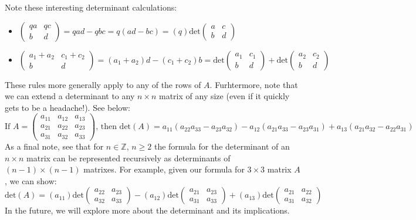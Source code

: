 \documentclass[12pt]{amsart}
\begin{document}
Note these interesting determinant calculations:
\begin{itemize}
	\item $\begin{pmatrix}qa&qc\\b&d\end{pmatrix} = qad-qbc = q(ad-bc) = (q)\mathrm{det}\begin{pmatrix}a&c\\b&d\end{pmatrix}$
	\item $\begin{pmatrix}a_1+a_2&c_1+c_2\\b&d\end{pmatrix} = (a_1+a_2)d-(c_1+c_2)b = \mathrm{det}\begin{pmatrix}a_1&c_1\\b&d\end{pmatrix}+\mathrm{det}\begin{pmatrix}a_2&c_2\\b&d\end{pmatrix}$
\end{itemize}
These rules more generally apply to any of the rows of $A$. Furhtermore, note that we can extend a determinant to any $n \times n$ matrix of any size (even if it quickly gets to be a headache!). See below:
\[\text{If } A=\begin{pmatrix}a_{11}&a_{12}&a_{13}\\a_{21}&a_{22}&a_{23}\\a_{31}&a_{32}&a_{33}\end{pmatrix}\text{, then } \mathrm{det}(A)=a_{11}(a_{22}a_{33}-a_{23}a_{32})-a_{12}(a_{21}a_{33}-a_{23}a_{31})+a_{13}(a_{21}a_{32}-a_{22}a_{31})\]
As a final note, see that for $n\in\mathbb{Z}$, $n\geq2$ the formula for the determinant of an $n\times n$ matrix can be represented recursively as determinants of $(n-1)\times (n-1)$ matrixes. For example, given our formula for $3 \times 3$ matrix $A$, we can show:
\[\mathrm{det}(A)=(a_{11})\mathrm{det}\begin{pmatrix}a_{22}&a_{23}\\a_{32}&a_{33}\end{pmatrix}
-(a_{12})\mathrm{det}\begin{pmatrix}a_{21}&a_{23}\\a_{31}&a_{33}\end{pmatrix}
+(a_{13})\mathrm{det}\begin{pmatrix}a_{21}&a_{22}\\a_{31}&a_{32}\end{pmatrix}\]
In the future, we will explore more about the determinant and its implications.
\end{document}
